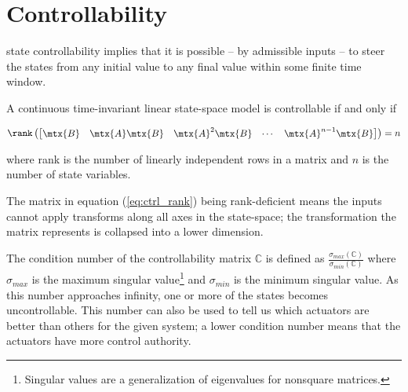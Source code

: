 \section{Controllability}

\Gls{state} controllability implies that it is possible -- by admissible inputs
-- to steer the \glspl{state} from any initial value to any final value within
some finite time window.

\begin{theorem}[Controllability]
  A continuous \gls{time-invariant} linear state-space \gls{model} is
  controllable if and only if

  \begin{equation}
    \rank\left(
    \begin{bmatrix}
      \mtx{B} & \mtx{A}\mtx{B} & \mtx{A}^2\mtx{B} & \cdots &
      \mtx{A}^{n-1}\mtx{B}
    \end{bmatrix}
    \right) = n
    \label{eq:ctrl_rank}
  \end{equation}

  where rank is the number of linearly independent rows in a matrix and $n$ is
  the number of \gls{state} variables.
\end{theorem}

The matrix in equation (\ref{eq:ctrl_rank}) being rank-deficient means the
\glspl{input} cannot apply transforms along all axes in the state-space; the
transformation the matrix represents is collapsed into a lower dimension.

The condition number of the controllability matrix $\mathbb{C}$ is defined as
$\frac{\sigma_{max}(\mathbb{C})}{\sigma_{min}(\mathbb{C})}$ where $\sigma_{max}$
is the maximum singular value\footnote{\label{footn:singular_val}Singular values
are a generalization of eigenvalues for nonsquare matrices.} and $\sigma_{min}$
is the minimum singular value. As this number approaches infinity, one or more
of the \glspl{state} becomes uncontrollable. This number can also be used to
tell us which actuators are better than others for the given \gls{system}; a
lower condition number means that the actuators have more control authority.
